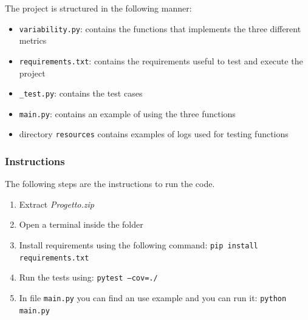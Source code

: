 \documentclass[12pt]{article}
\begin{document}
The project is structured in the following manner:
\begin{itemize}
	\item \texttt{variability.py}: contains the functions that implements the three different metrics
	\item \texttt{requirements.txt}: contains the requirements useful to test and execute the project
	\item \texttt{\_test.py}: contains the test cases
	\item \texttt{main.py}: contains an example of using the three functions
	\item directory \texttt{resources} contains examples of logs used for testing functions
\end{itemize}

\subsubsection*{Instructions}

The following steps are the instructions to run the code.
\begin{enumerate}
	\item Extract \textit{Progetto.zip}
	\item Open a terminal inside the folder
	\item Install requirements using the following command: \texttt{pip install requirements.txt}
	\item Run the tests using: \texttt{pytest --cov=./}
	\item In file \texttt{main.py} you can find an use example and you can run it: \texttt{python main.py}
\end{enumerate}

 

\end{document}
